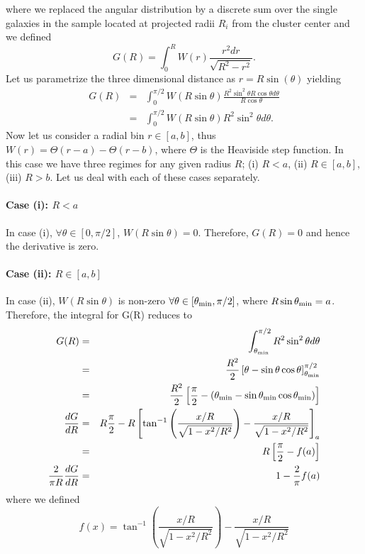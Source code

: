 \documentclass[a4paper,fleqn,usenatbib]{mnras}
\begin{document}
where we replaced the angular distribution by a discrete sum over the single galaxies in the sample located at projected radii $R_i$ from the cluster center and we defined
\begin{equation}
G(R) = \int_{0}^{R} W(r) \frac{r^2 dr}{\sqrt{R^2-r^2}}.
\end{equation}
Let us parametrize the three dimensional distance as $r=R \sin(\theta)$ yielding
\begin{align}
G(R) &=& \int_{0}^{\pi/2} W(R\sin\theta) \frac{R^2 \sin^2\theta R \cos\theta d\theta}{R\cos\theta}\\
&=& \int_{0}^{\pi/2} W(R\sin\theta) R^2 \sin^2\theta  d\theta.
\end{align}
Now let us consider a radial bin $r\in[a, b]$, thus $W(r)=\Theta(r-a) - \Theta(r-b)$, where $\Theta$ is the Heaviside step function. In this case we have three regimes for any given radius $R$; (i) $R<a$, (ii) $R\in[a, b]$, (iii) $R>b$. Let us deal with each of these cases separately.

\paragraph{Case (i): $R<a$}
In case (i), $\forall \theta\in[0, \pi/2]$, $W(R\sin\theta)=0$. Therefore, $G(R)=0$ and hence the derivative is zero.

\paragraph{Case (ii): $R\in[a,b]$}
In case (ii), $W(R\sin\theta)$ is non-zero $\forall \theta\in[\theta_{\rm min}, \pi/2]$, where $R\sin\theta_{\rm min}=a$. Therefore, the integral for G(R) reduces to
\begin{eqnarray}
G(R) &=& \int_{\theta_{\rm min}}^{\pi/2} R^2 \sin^2\theta  d\theta \\
&=& \frac{R^2}{2} \left[\theta-\sin\theta\cos\theta\right]_{\theta_{\rm min}}^{\pi/2}\\
&=& \frac{R^2}{2} \left[ \frac{\pi}{2} - (\theta_{\rm min}-\sin\theta_{\rm min}\cos\theta_{\rm min})  \right] \\
\frac{dG}{dR} &=& R  \frac{\pi}{2} -  R  \left[\tan^{-1}\left(\frac{x/R}{\sqrt{1-x^2/R^2}}\right) - \frac{x/R}{\sqrt{1-x^2/R^2}}\right]_a \nonumber \\
&=& R \left[ \frac{\pi}{2} - f(a) \right] \\
\frac{2}{\pi R}\frac{dG}{dR} &=& 1 - \frac{2}{\pi} f(a)
\end{eqnarray}
where we defined
\begin{equation}
f(x)=\tan^{-1}\left(\frac{x/R}{\sqrt{1-x^2/R^2}}\right) - \frac{x/R}{\sqrt{1-x^2/R^2}}
\end{equation}
\end{document}
